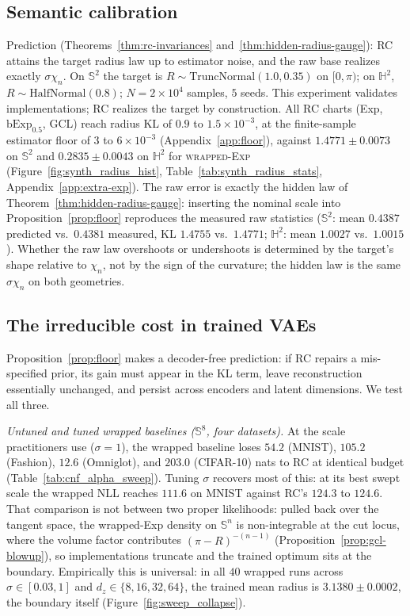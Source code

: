 \documentclass{article}
\theoremstyle{definition}
\theoremstyle{remark}
\newcommand{\RawExp}{\textsc{wrapped-Exp}}
\newcommand{\bExp}{\mathrm{bExp}}
\newcommand{\SSS}{\mathbb{S}}
\newcommand{\HH}{\mathbb{H}}
\begin{document}
\subsection{Semantic calibration}
\label{sec:exp_semantics}
Prediction (Theorems~\ref{thm:rc-invariances} and~\ref{thm:hidden-radius-gauge}): RC attains the target radius law up to estimator noise, and the raw base realizes exactly $\sigma\chi_n$. On $\SSS^2$ the target is $R\sim\mathrm{TruncNormal}(1.0,0.35)$ on $[0,\pi)$; on $\HH^2$, $R\sim\mathrm{HalfNormal}(0.8)$; $N=2\times10^4$ samples, $5$ seeds. This experiment validates implementations; RC realizes the target by construction. All RC charts (Exp, $\bExp_{0.5}$, GCL) reach radius KL of $0.9$ to $1.5\times10^{-3}$, at the finite-sample estimator floor of $3$ to $6\times10^{-3}$ (Appendix~\ref{app:floor}), against $1.4771\pm0.0073$ on $\SSS^2$ and $0.2835\pm0.0043$ on $\HH^2$ for \RawExp{} (Figure~\ref{fig:synth_radius_hist}, Table~\ref{tab:synth_radius_stats}, Appendix~\ref{app:extra-exp}). The raw error is exactly the hidden law of Theorem~\ref{thm:hidden-radius-gauge}: inserting the nominal scale into Proposition~\ref{prop:floor} reproduces the measured raw statistics ($\SSS^2$: mean $0.4387$ predicted vs.\ $0.4381$ measured, KL $1.4755$ vs.\ $1.4771$; $\HH^2$: mean $1.0027$ vs.\ $1.0015$). Whether the raw law overshoots or undershoots is determined by the target's shape relative to $\chi_n$, not by the sign of the curvature; the hidden law is the same $\sigma\chi_n$ on both geometries.

\subsection{The irreducible cost in trained VAEs}
\label{sec:exp_cost}
Proposition~\ref{prop:floor} makes a decoder-free prediction: if RC repairs a mis-specified prior, its gain must appear in the KL term, leave reconstruction essentially unchanged, and persist across encoders and latent dimensions. We test all three.

\emph{Untuned and tuned wrapped baselines ($\SSS^8$, four datasets).} At the scale practitioners use ($\sigma{=}1$), the wrapped baseline loses $54.2$ (MNIST), $105.2$ (Fashion), $12.6$ (Omniglot), and $203.0$ (CIFAR-10) nats to RC at identical budget (Table~\ref{tab:cnf_alpha_sweep}). Tuning $\sigma$ recovers most of this: at its best swept scale the wrapped NLL reaches $111.6$ on MNIST against RC's $124.3$ to $124.6$. That comparison is not between two proper likelihoods: pulled back over the tangent space, the wrapped-Exp density on $\SSS^n$ is non-integrable at the cut locus, where the volume factor contributes $(\pi-R)^{-(n-1)}$ (Proposition~\ref{prop:gcl-blowup}), so implementations truncate and the trained optimum sits at the boundary. Empirically this is universal: in all $40$ wrapped runs across $\sigma\in[0.03,1]$ and $d_z\in\{8,16,32,64\}$, the trained mean radius is $3.1380\pm0.0002$, the boundary itself (Figure~\ref{fig:sweep_collapse}).
\end{document}
